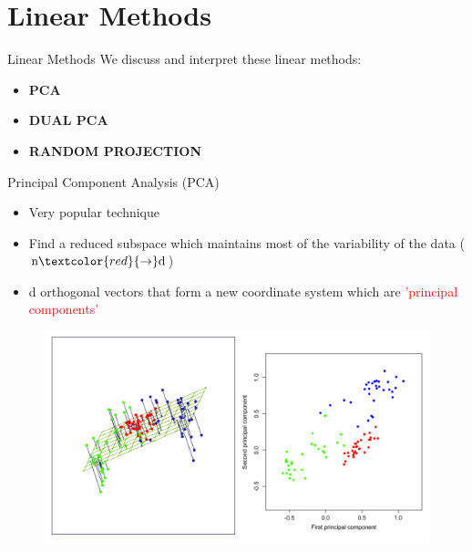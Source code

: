 \documentclass[10pt]{beamer}
\begin{document}
\section{Linear Methods}
\begin{frame}{Linear Methods}
	We discuss and interpret these linear methods: 
	\begin{itemize}
		\item \textbf{PCA}
		\item \textbf{DUAL PCA} 
		\item \textbf{RANDOM PROJECTION} 
		
	\end{itemize}
	
\end{frame}


\begin{frame}{Principal Component Analysis (PCA)}
\begin{itemize}
		\item Very popular technique
        \item Find a reduced subspace which  maintains most of the variability of the data ($\hbox{n} \textcolor{red}{\rightarrow} \hbox{d}$) 
        
        \item  d orthogonal vectors that form a new coordinate system which are \textcolor{red}{'principal components'}
	\end{itemize}

\begin{figure}[h]
    \includegraphics[scale=.4]{pca.png}
    \end{figure}
    
\end{frame} 
\end{document}
